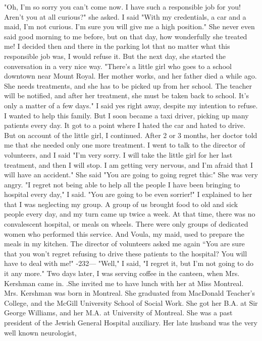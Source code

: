 "Oh, I'm so sorry you can't come now. I have such a responsible job for you! 
Aren't you at all curious?" she asked. 
I said "With my credentials, a car and a maid, I'm not curious. I'm sure you 
will give me a high position." 
She never even said good morning to me before, but on that day, how wonderfully she treated me! I decided then and there in the parking lot that no matter 
what this responsible job was, I would refuse it. 
But the next day, she started the conversation in a very nice way. "There's 
a little girl who goes to a school downtown near Mount Royal. Her mother works, 
and her father died a while ago. She needs treatments, and she has to be picked up 
from her school. The teacher will be notified, and after her treatment, she must 
be taken back to school. It's only a matter of a few days." 
I said yes right away, despite my intention to refuse. I wanted to help this 
family. But I soon became a taxi driver, picking up many patients every day. It 
got to a point where I hated the car and hated to drive. But on account of the little
girl, I continued. After 2 or 3 months, her doctor told me that she needed 
only one more treatment. I went to talk to the director of volunteers, and I said 
"I'm very sorry. I will take the little girl for her last treatment, and then I 
will stop. I am getting very nervous, and I'm afraid that I will have an accident." 
She said "You are going to going regret this:" She was very angry. 
"I regret not being able to help all the people I have been bringing to hospital every day," I said. 
"You are going to be even sorrier!" 
I explained to her that I was neglecting my group. A group of us brought 
food to old and sick people every day, and my turn came up twice a week. At that 
time, there was no convalescent hospital, or meals on wheels. There were only groups 
of dedicated women who performed this service. And Voula, my maid, used to prepare 
the meals in my kitchen. 
The director of volunteers asked me again “You are sure that you won't regret 
refusing to drive these patients to the hospital? You will have to deal with me!" 
-232— 
"Well," I said, "I regret it, but I'm not going to do it any more." 
Two days later, I was serving coffee in the canteen, when Mrs. Kershman came 
in. .She invited me to have lunch with her at Miss Montreal. Mrs. Kershman was
born in Montreal. She graduated from MacDonald Teacher's College, and the McGill 
University School of Social Work. She got her B.A. at Sir George Williams, and her 
M.A. at University of Montreal. She was a past president of the Jewish General Hospital auxiliary. Her late husband was the very well known neurologist,
